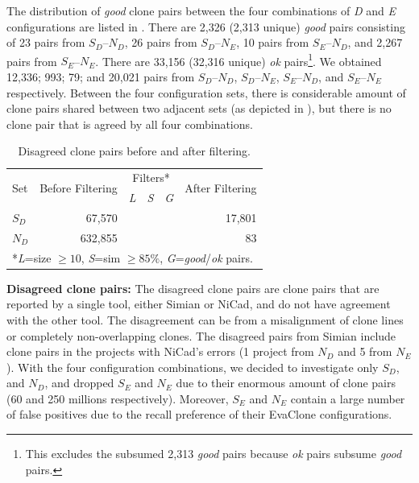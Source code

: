 \documentclass[sigconf,review, anonymous]{acmart}
\begin{document}
The distribution of \textit{good} clone pairs between the four
combinations of \textit{D} and \textit{E} configurations are listed in
.  There are 2,326 (2,313 unique)
\textit{good} pairs consisting of 23 pairs from $S_D$--$N_D$, 26 pairs
from $S_D$--$N_E$, 10 pairs from $S_E$--$N_D$, and 2,267 pairs from
$S_E$--$N_E$. There are 33,156 (32,316 unique) \textit{ok}
pairs\footnote{This excludes the subsumed 2,313 \textit{good}
  pairs because \textit{ok} pairs subsume
  \textit{good} pairs.}. We obtained 12,336; 993; 79; and 20,021 pairs
from $S_D$--$N_D$, $S_D$--$N_E$, $S_E$--$N_D$, and $S_E$--$N_E$
respectively. Between the four configuration sets, there is
considerable amount of clone pairs shared between two adjacent sets
(as depicted in ), but there is no clone pair
that is agreed by all four combinations.

\begin{table}
	\centering
	\caption{Disagreed clone pairs before and after filtering.}
	\label{tab:online_clone_pairs}
	\begin{tabular}{l|r|c|c|c|r}
		\hline
		\multirow{2}{*}{Set} & \multirow{2}{*}{Before Filtering} & \multicolumn{3}{c|}{Filters*} & \multirow{2}{*}{After Filtering} \\ \cline{3-5}
		& & \textit{L} & \textit{S} & \textit{G} & \\
		\hline 
		\multirow{1}{*}{$S_D$} & 67,570 & \checkmark & & \checkmark & 17,801 \\
		\multirow{1}{*}{$N_D$} & 632,855 & \checkmark & \checkmark & \checkmark & 83 \\ 
		\hline
		\multicolumn{6}{l}{*\textit{L}=size $\geq 10$, \textit{S}=sim $\geq 85\%$, \textit{G}=\textit{good}/\textit{ok} pairs.}  \\
	\end{tabular} %
\end{table}

\textbf{Disagreed clone pairs: }
The disagreed clone pairs are clone pairs that are reported by a
single tool, either Simian or NiCad, and do not have agreement with
the other tool. The disagreement can be from a misalignment of clone
lines or completely non-overlapping clones. The disagreed pairs from
Simian include clone pairs in the projects with NiCad's errors (1
project from $N_D$ and 5 from $N_E$).  With the four configuration
combinations, we decided to investigate only $S_D$, and $N_D$, and
dropped $S_E$ and $N_E$ due to their enormous amount of clone pairs
(60 and 250 millions respectively). Moreover, $S_E$ and $N_E$ contain
a large number of false positives due to the recall preference of
their EvaClone configurations.
\end{document}
